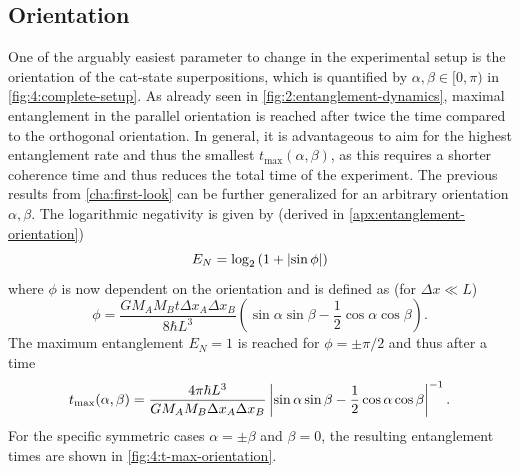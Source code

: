 \subsection{Orientation}
One of the arguably easiest parameter to change in the experimental setup is the orientation of the cat-state superpositions, which is quantified by $\alpha, \beta \in [0, \pi)$ in \cref{fig:4:complete-setup}.
As already seen in \cref{fig:2:entanglement-dynamics}, maximal entanglement in the parallel orientation is reached after twice the time compared to the orthogonal orientation.
In general, it is advantageous to aim for the highest entanglement rate and thus the smallest $t_\mathrm{max}(\alpha, \beta)$, as this requires a shorter coherence time and thus reduces the total time of the experiment.
The previous results from \cref{cha:first-look} can be further generalized for an arbitrary orientation $\alpha, \beta$. The logarithmic negativity is given by (derived in \cref{apx:entanglement-orientation})
\begin{equation}
  E_N = \log_2\left(1+\left\lvert\sin\phi\right\rvert\right)
\end{equation}
where $\phi$ is now dependent on the orientation and is defined as (for $\Delta x \ll L$)
\begin{equation}\label{eq:4:phi-orientation}
  \phi = \frac{G M_A M_B t \Delta x_A \Delta x_B}{8\hbar L^3} \left(\sin\alpha\sin\beta-\frac{1}{2}\cos\alpha\cos\beta\right) .
\end{equation}
The maximum entanglement $E_N=1$ is reached for $\phi = \pm \pi/2$ and thus after a time
\begin{equation}\label{eq:4:t-max}
  t_\mathrm{max}(\alpha,\beta) = \frac{4\pi \hbar L^3}{G M_A M_B \Delta x_A \Delta x_B}\left\lvert\sin\alpha\sin\beta - \frac{1}{2}\cos\alpha\cos\beta\right\rvert^{-1}.
\end{equation}
For the specific symmetric cases $\alpha=\pm \beta$ and $\beta = 0$, the resulting entanglement times are shown in \cref{fig:4:t-max-orientation}.
